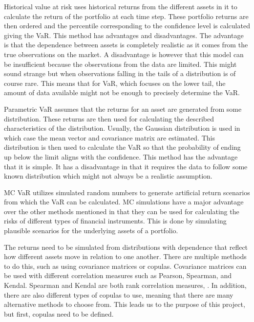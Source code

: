 Historical value at risk uses historical returns from the different assets in it to calculate the return of the portfolio at each time step. These portfolio returns are then ordered and the percentile corresponding to the confidence level is calculated giving the \gls{VaR}. This method has advantages and disadvantages. The advantage is that the dependence between assets is completely realistic as it comes from the true observations on the market\footnotemark[\value{footnote}]. A disadvantage is however that this model can be insufficient because the observations from the data are limited. This might sound strange but when observations falling in the tails of a distribution is of course rare. This means that for \gls{VaR}, which focuses on the lower tail, the amount of data available might not be enough to precisely determine the VaR.  

Parametric \gls{VaR} assumes that the returns for an asset are generated from some distribution. These returns are then used for calculating the described characteristics of the distribution. Usually, the Gaussian distribution is used in which case the mean vector and covariance matrix are estimated. This distribution is then used to calculate the \gls{VaR} so that the probability of ending up below the limit aligns with the confidence\footnotemark[\value{footnote}]. This method has the advantage that it is simple. It has a disadvantage in that it requires the data to follow some known distribution which might not always be a realistic assumption.  

\gls{MC} \gls{VaR} utilizes simulated random numbers to generate artificial return scenarios from which the \gls{VaR} can be calculated\footnotemark[\value{footnote}]. \gls{MC} simulations have a major advantage over the other methods mentioned in that they can be used for calculating the risks of different types of financial instruments. This is done by simulating plausible scenarios for the underlying assets of a portfolio.  

The returns need to be simulated from distributions with dependence that reflect how different assets move in relation to one another. There are multiple methods to do this, such as using covariance matrices or copulas. Covariance matrices can be used with different correlation measures such as Pearson, Spearman, and Kendal. Spearman and Kendal are both rank correlation measures, \citet[pp.~256-258]{Alexander2008}. In addition, there are also different types of copulas to use, meaning that there are many alternative methods to choose from. This leads us to the purpose of this project, but first, copulas need to be defined.

